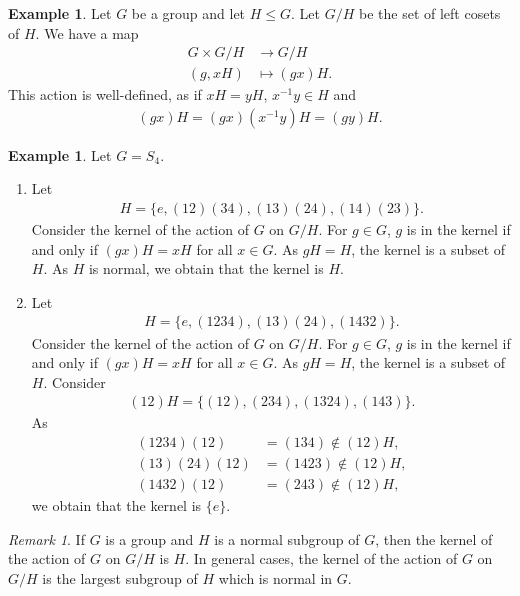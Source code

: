 \documentclass[12pt]{report}
\theoremstyle{plain}
\theoremstyle{remark}
\newtheorem*{remark}{Remark}
\theoremstyle{definition}
\newtheorem{example}[theorem]{Example}
\begin{document}
\begin{example}
    Let $G$ be a group and let $H\le G$. Let $G/H$ be the set of left cosets of $H$. We have a map
    \begin{align*}
        G\times G/H & \rightarrow G/H \\
        (g,xH) &\mapsto (gx)H.
    \end{align*}
    This action is well-defined, as if $xH=yH$, $x^{-1}y\in H$ and
    \begin{align*}
        (gx)H=(gx)(x^{-1}y)H = (gy)H.
    \end{align*}
\end{example}

\begin{example}
    Let $G=S_4$.
    \begin{enumerate}
        \item Let
        \begin{align*}
            H=\{e,(12)(34),(13)(24),(14)(23)\}.
        \end{align*}
        Consider the kernel of the action of $G$ on $G/H$. For $g\in G$, $g$ is in the kernel if and only if $(gx)H=xH$ for all $x\in G$. As $gH=H$, the kernel is a subset of $H$. As $H$ is normal, we obtain that the kernel is $H$.
        \item Let
        \begin{align*}
            H=\{e,(1234),(13)(24),(1432)\}.
        \end{align*}
        Consider the kernel of the action of $G$ on $G/H$. For $g\in G$, $g$ is in the kernel if and only if $(gx)H=xH$ for all $x\in G$. As $gH=H$, the kernel is a subset of $H$. Consider
        \begin{align*}
            (12)H = \{(12),(234),(1324),(143)\}.
        \end{align*}
        As
        \begin{align*}
            (1234)(12)&=(134) \not\in (12)H, \\
            (13)(24)(12)&=(1423)\not\in (12)H, \\
            (1432)(12)&=(243)\not\in (12)H,
        \end{align*}
        we obtain that the kernel is $\{e\}$.
    \end{enumerate}
\end{example}
\begin{remark}
    If $G$ is a group and $H$ is a normal subgroup of $G$, then the kernel of the action of $G$ on $G/H$ is $H$. In general cases, the kernel of the action of $G$ on $G/H$ is the largest subgroup of $H$ which is normal in $G$.
\end{remark}
\end{document}
